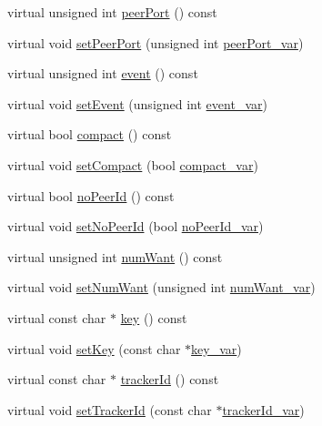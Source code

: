 \begin{DoxyCompactItemize}
virtual unsigned int \hyperlink{classBTTrackerMsgAnnounce_a9ae50e8df5acb174c65665b51f7cd3b2}{peer\+Port} () const 
\item 
virtual void \hyperlink{classBTTrackerMsgAnnounce_ab0dfd593e0377b033ffdec5673a7d303}{set\+Peer\+Port} (unsigned int \hyperlink{classBTTrackerMsgAnnounce_a8284aedb73866bde651c42c6faf6b486}{peer\+Port\+\_\+var})
\item 
virtual unsigned int \hyperlink{classBTTrackerMsgAnnounce_a1ee38ffb2e3538ab73b3fbec32b1f821}{event} () const 
\item 
virtual void \hyperlink{classBTTrackerMsgAnnounce_a018eaf9bc7c3fe9b3d8f64de6f0ba5db}{set\+Event} (unsigned int \hyperlink{classBTTrackerMsgAnnounce_acbbb1522bc659a2972e7b73eaa201df2}{event\+\_\+var})
\item 
virtual bool \hyperlink{classBTTrackerMsgAnnounce_a1196242607e513f3fb77d76f12151dd8}{compact} () const 
\item 
virtual void \hyperlink{classBTTrackerMsgAnnounce_ad07de17eb9f679db192a0a03f70f7a38}{set\+Compact} (bool \hyperlink{classBTTrackerMsgAnnounce_a22ee38ffb1718174a7684bdb13200e24}{compact\+\_\+var})
\item 
virtual bool \hyperlink{classBTTrackerMsgAnnounce_a668f4f591498f054b479d9c85a259ff5}{no\+Peer\+Id} () const 
\item 
virtual void \hyperlink{classBTTrackerMsgAnnounce_a0dcdf428a91226f9abe75242043f17a9}{set\+No\+Peer\+Id} (bool \hyperlink{classBTTrackerMsgAnnounce_a3e10bd3398780f6490f349d749e0e578}{no\+Peer\+Id\+\_\+var})
\item 
virtual unsigned int \hyperlink{classBTTrackerMsgAnnounce_a393acf80f1f1f03a74ff056d771d7a24}{num\+Want} () const 
\item 
virtual void \hyperlink{classBTTrackerMsgAnnounce_a010b11a96932c69df814d81ce574df44}{set\+Num\+Want} (unsigned int \hyperlink{classBTTrackerMsgAnnounce_a080f57e3a09c716d69410dcf0d62a705}{num\+Want\+\_\+var})
\item 
virtual const char $\ast$ \hyperlink{classBTTrackerMsgAnnounce_a8599ec1d23cb24615bfca42ef46da10d}{key} () const 
\item 
virtual void \hyperlink{classBTTrackerMsgAnnounce_a7c3251f1c32620740ca08e2e2bacf95f}{set\+Key} (const char $\ast$\hyperlink{classBTTrackerMsgAnnounce_abaf4cc9b3fd1ab417d370b72d65e5420}{key\+\_\+var})
\item 
virtual const char $\ast$ \hyperlink{classBTTrackerMsgAnnounce_a2223c19c0480131ad7085cb4d8e6fb36}{tracker\+Id} () const 
\item 
virtual void \hyperlink{classBTTrackerMsgAnnounce_acd0051984ab65138cb28204837e91a32}{set\+Tracker\+Id} (const char $\ast$\hyperlink{classBTTrackerMsgAnnounce_a1353228205f838d4de9c6e22bb2a6573}{tracker\+Id\+\_\+var})
\end{DoxyCompactItemize}
